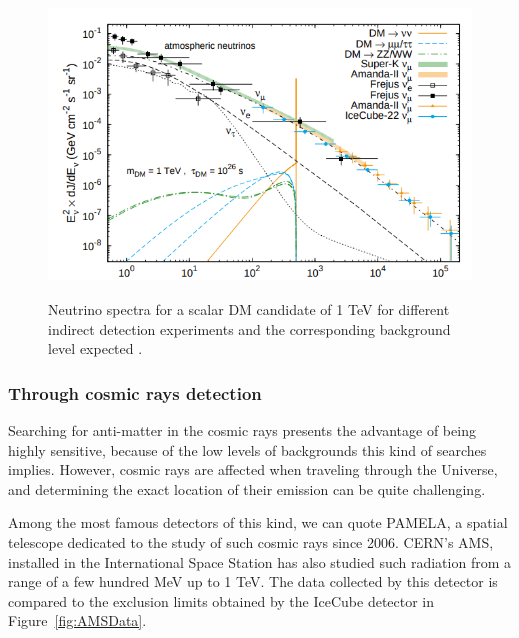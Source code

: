 \documentclass[a4paper, 10pt, openright]{report}
\begin{document}
\begin{figure}[htbp]
\begin{center}
\includegraphics[width=12cm, height=8cm]{figs/BkgNeutrino.png}
\caption{Neutrino spectra for a scalar \ac{DM} candidate of 1 TeV for different indirect detection experiments and the corresponding background level expected \cite{BkgNeutrino}.}
\label{fig:BkgNeutrino}
\end{center}
\end{figure}

\subsubsection*{Through cosmic rays detection}

Searching for anti-matter in the cosmic rays presents the advantage of being highly sensitive, because of the low levels of backgrounds this kind of searches implies. However, cosmic rays are affected when traveling through the Universe, and determining the exact location of their emission can be quite challenging.

Among the most famous detectors of this kind, we can quote PAMELA, a spatial telescope dedicated to the study of such cosmic rays since 2006. \ac{CERN}'s \ac{AMS}, installed in the International Space Station has also studied such radiation from a range of a few hundred MeV up to 1 TeV. The data collected by this detector is compared to the exclusion limits obtained by the IceCube detector in Figure~\ref{fig:AMSData}.
\end{document}
